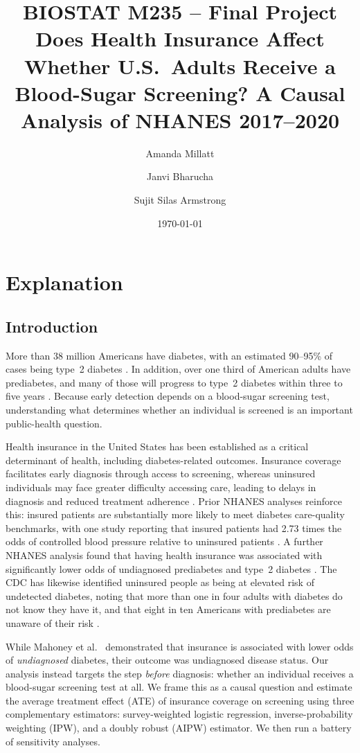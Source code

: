 \documentclass[12pt]{article}
\title{BIOSTAT M235 -- Final Project\\
\large Does Health Insurance Affect Whether U.S.\ Adults Receive a
Blood-Sugar Screening? A Causal Analysis of NHANES 2017--2020}
\author{Amanda Millatt \and Janvi Bharucha \and Sujit Silas Armstrong}
\date{\today}
\begin{document}
\doublespacing

\maketitle

\newpage

\section{Explanation}

\subsection{Introduction} \label{subsec:intro}

More than 38 million Americans have diabetes, with an estimated 90--95\% of
cases being type~2 diabetes \cite{cdc2024ndsr}. In addition, over one third of
American adults have prediabetes, and many of those will progress to type~2
diabetes within three to five years \cite{cdc2024ndsr}. Because early detection
depends on a blood-sugar screening test, understanding what determines whether
an individual is screened is an important public-health question.

Health insurance in the United States has been established as a critical
determinant of health, including diabetes-related outcomes. Insurance coverage
facilitates early diagnosis through access to screening, whereas uninsured
individuals may face greater difficulty accessing care, leading to delays in
diagnosis and reduced treatment adherence \cite{bolarinwa2025}. Prior NHANES
analyses reinforce this: insured patients are substantially more likely to meet
diabetes care-quality benchmarks, with one study reporting that insured patients
had 2.73 times the odds of controlled blood pressure relative to uninsured
patients \cite{casagrande2016}. A further NHANES analysis found that having
health insurance was associated with significantly lower odds of undiagnosed
prediabetes and type~2 diabetes \cite{mahoney2020}. The CDC has likewise
identified uninsured people as being at elevated risk of undetected diabetes,
noting that more than one in four adults with diabetes do not know they have it,
and that eight in ten Americans with prediabetes are unaware of their risk
\cite{cdc2023screening}.

While Mahoney et al.\ \cite{mahoney2020} demonstrated that insurance is
associated with lower odds of \emph{undiagnosed} diabetes, their outcome was
undiagnosed disease status. Our analysis instead targets the step \emph{before}
diagnosis: whether an individual receives a blood-sugar screening test at all.
We frame this as a causal question and estimate the average treatment effect
(ATE) of insurance coverage on screening using three complementary
estimators: survey-weighted logistic regression, inverse-probability weighting
(IPW), and a doubly robust (AIPW) estimator. We then run a battery of
sensitivity analyses.
\end{document}
